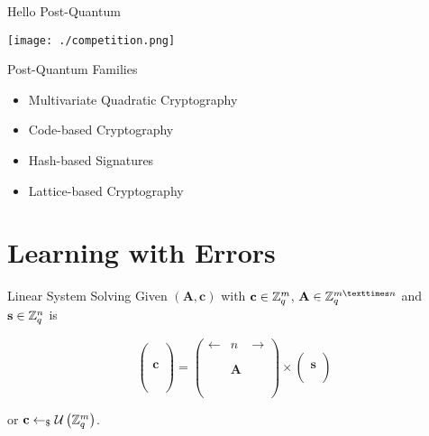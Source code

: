\documentclass[presentation,smaller]{beamer}
\newcommand{\ZZq}[1][blank]{\ensuremath{\ifthenelse{\equal{#1}{blank}}{\mathbb{Z}_q}{\mathbb{Z}_q\left[#1\right]}\xspace}}
\renewcommand{\U}[1]{\ensuremath{\mathcal{U}\left( {#1} \right)}\xspace}
\renewcommand{\vec}[1]{\ensuremath{\mathbf{#1}}\xspace}
\newcommand{\sample}{\ensuremath{\leftarrow_{\$}}}
\begin{document}
\begin{frame}[label={sec:orgf7b0cfd}]{Hello Post-Quantum}
\begin{center}
\begin{center}
\texttt{[image: ./competition.png]}
\end{center}
\end{center}
\end{frame}


\begin{frame}[label={sec:orgf00203b}]{Post-Quantum Families}
\begin{itemize}
\item Multivariate Quadratic Cryptography
\item Code-based Cryptography
\item Hash-based Signatures
\item \alert<2->{Lattice-based Cryptography}
\end{itemize}
\end{frame}

\section{Learning with Errors}
\label{sec:org4bac775}

\begin{frame}[label={sec:org8b2c2ec}]{Linear System Solving}
Given \((\vec{A},\vec{c})\) with \(\vec{c} \in \ZZq^{m}\), \(\vec{A} \in \ZZq^{m × n}\) and \(\vec{s} \in \ZZq^{n}\) is

\[
\left(\begin{array}{c}
\\
\\
\\ 
\vec{c} \\
\\
\\
\\
\end{array} \right) = \left(
\begin{array}{ccc}
\leftarrow & n & \rightarrow \\
\\
\\ 
& \vec{A} & \\
\\
\\
\\
\end{array} \right) \times \left( \begin{array}{c}
\\
\vec{s} \\
\\
\end{array} \right)
\]

or \(\vec{c} \sample \U{\ZZq^{m}}\).
\end{frame}
\end{document}
